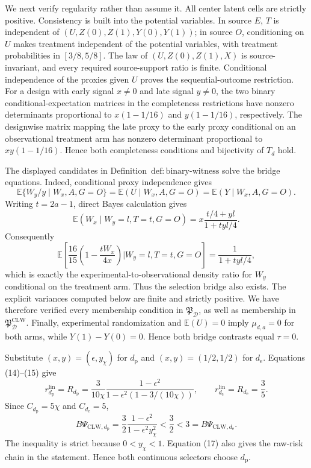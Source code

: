 We next verify regularity rather than assume it. All center latent cells are strictly positive. Consistency is built into the potential variables. In source \(E\), \(T\) is independent of \((U,Z(0),Z(1),Y(0),Y(1))\); in source \(O\), conditioning on \(U\) makes treatment independent of the potential variables, with treatment probabilities in \([3/8,5/8]\). The law of \((U,Z(0),Z(1),X)\) is source-invariant, and every required source-support ratio is finite. Conditional independence of the proxies given \(U\) proves the sequential-outcome restriction. For a design with early signal \(x\ne0\) and late signal \(y\ne0\), the two binary conditional-expectation matrices in the completeness restrictions have nonzero determinants proportional to \(x(1-1/16)\) and \(y(1-1/16)\), respectively. The designwise matrix mapping the late proxy to the early proxy conditional on an observational treatment arm has nonzero determinant proportional to \(xy(1-1/16)\). Hence both completeness conditions and bijectivity of \(T_d\) hold.

The displayed candidates in Definition~\(\mathrm{def{:}binary\text{-}witness}\) solve the bridge equations. Indeed, conditional proxy independence gives
\[
 \mathbb E\{W_y/y\mid W_x,A,G=O\}
 =\mathbb E(U\mid W_x,A,G=O)=\mathbb E(Y\mid W_x,A,G=O).
\]
Writing \(t=2a-1\), direct Bayes calculation gives
\[
 \mathbb E(W_x\mid W_y=l,T=t,G=O)
 =x\frac{t/4+yl}{1+tyl/4}.
\]
Consequently
\[
 \mathbb E\left[\frac{16}{15}\left(1-\frac{tW_x}{4x}\right)
 \mathrel{\Big|}W_y=l,T=t,G=O\right]
 =\frac{1}{1+tyl/4},                                      \tag{16}
\]
which is exactly the experimental-to-observational density ratio for \(W_y\) conditional on the treatment arm. Thus the selection bridge also exists. The explicit variances computed below are finite and strictly positive. We have therefore verified every membership condition in \(\mathfrak P_{\mathcal D}\), as well as membership in \(\mathfrak P_{\mathcal D}^{\mathrm{CLW}}\). Finally, experimental randomization and \(\mathbb E(U)=0\) imply \(\mu_{d,a}=0\) for both arms, while \(Y(1)-Y(0)=0\). Hence both bridge contrasts equal \(\tau=0\).

Substitute \((x,y)=(\epsilon,y_\chi)\) for \(d_{\mathrm p}\) and \((x,y)=(1/2,1/2)\) for \(d_{\mathrm e}\). Equations (14)--(15) give
\[
 r_{d_{\mathrm p}}^{\mathrm{lin}}
 =R_{d_{\mathrm p}}
 =\frac{3}{10\chi}
 \frac{1-\epsilon^2}{1-\epsilon^2(1-3/(10\chi))},
 \qquad
 r_{d_{\mathrm e}}^{\mathrm{lin}}=R_{d_{\mathrm e}}=\frac{3}{5}. \tag{17}
\]
Since \(C_{d_{\mathrm p}}=5\chi\) and \(C_{d_{\mathrm e}}=5\),
\[
 B\Psi_{\mathrm{CLW},d_{\mathrm p}}
 =\frac{3}{2}\frac{1-\epsilon^2}{1-\epsilon^2y_\chi^2}
 <\frac{3}{2}<3=B\Psi_{\mathrm{CLW},d_{\mathrm e}}.       \tag{18}
\]
The inequality is strict because \(0<y_\chi<1\). Equation (17) also gives the raw-risk chain in the statement. Hence both continuous selectors choose \(d_{\mathrm p}\).


